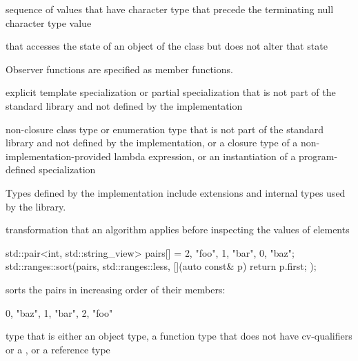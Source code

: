 %
%
sequence of values that have
character type
that precede the terminating null character type
value

%
 that accesses the state of an object of the class
but does not alter that state

\begin{defnote}
Observer functions are specified as
member functions.
\end{defnote}

%
explicit template specialization or partial specialization
that is not part of the \Cpp{} standard library and
not defined by the implementation

%
non-closure class type or enumeration type
that is not part of the \Cpp{} standard library and
not defined by the implementation,
or a closure type of a non-implementation-provided lambda expression,
or an instantiation of a program-defined specialization

\begin{defnote}
Types defined by the implementation include
extensions and internal types used by the library.
\end{defnote}

%
 transformation that
an algorithm applies before inspecting the values of elements

\begin{example}
\begin{codeblock}
std::pair<int, std::string_view> pairs[] = {{2, "foo"}, {1, "bar"}, {0, "baz"}};
std::ranges::sort(pairs, std::ranges::less{}, [](auto const& p) { return p.first; });
\end{codeblock}
sorts the pairs in increasing order of their  members:
\begin{codeblock}
{{0, "baz"}, {1, "bar"}, {2, "foo"}}
\end{codeblock}
\end{example}

%
type that is either an
object type, a function type that does not have cv-qualifiers or a
, or a reference type

